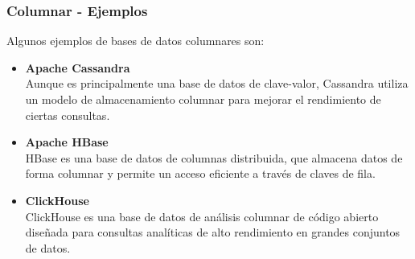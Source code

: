 \begin{frame}
    \frametitle{Columnar - Ejemplos}

    Algunos ejemplos de bases de datos columnares son: 
    
    \begin{itemize}
        \item \textbf{Apache Cassandra}\\
        Aunque es principalmente una base de datos de clave-valor, Cassandra utiliza un modelo de almacenamiento columnar para mejorar el rendimiento de ciertas consultas.  
        \item \textbf{Apache HBase}\\
        HBase es una base de datos de columnas distribuida, que almacena datos de forma columnar y permite un acceso eficiente a través de claves de fila.   
        \item \textbf{ClickHouse}\\
        ClickHouse es una base de datos de análisis columnar de código abierto diseñada para consultas analíticas de alto rendimiento en grandes conjuntos de datos.
    \end{itemize}
\end{frame}